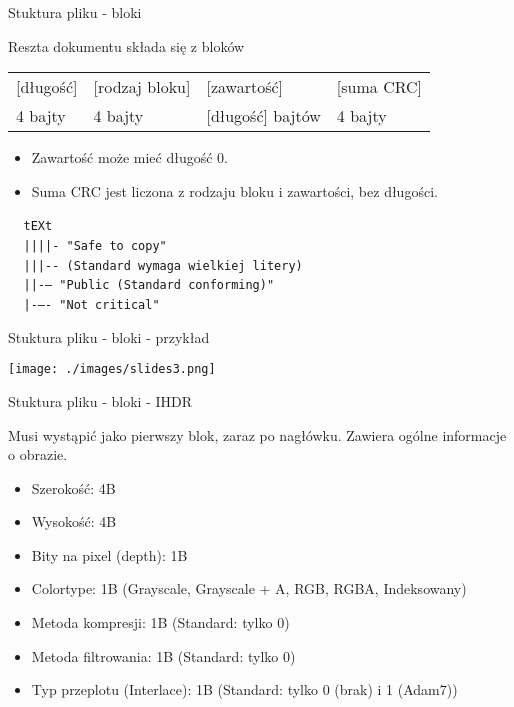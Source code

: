 \documentclass[presentation]{beamer}
\begin{document}
\begin{frame}[fragile,label={sec:orgf390abe}]{Stuktura pliku - bloki}
 \begin{block}{Reszta dokumentu składa się z bloków}
\begin{center}
\begin{tabular}{llll}
[długość] & [rodzaj bloku] & [zawartość] & [suma CRC]\\
4 bajty & 4 bajty & [długość] bajtów & 4 bajty\\
\end{tabular}
\end{center}

\begin{itemize}
\item Zawartość może mieć długość 0.
\item Suma CRC jest liczona z rodzaju bloku i zawartości, bez długości.
\end{itemize}

\(\>\) \(\>\)  \texttt{tEXt} \\
\(\>\) \(\>\)  \texttt{||||- "Safe to copy"} \\
\(\>\) \(\>\)  \texttt{|||-{}- (Standard wymaga wielkiej litery)} \\
\(\>\) \(\>\)  \texttt{||-{}-- "Public (Standard conforming)"} \\
\(\>\) \(\>\)  \texttt{|-{}--{}- "Not critical"} \\
\end{block}
\end{frame}

\begin{frame}[label={sec:org6177721}]{Stuktura pliku - bloki - przykład}
\begin{center}
\texttt{[image: ./images/slides3.png]}
\end{center}
\end{frame}

\begin{frame}[label={sec:orgd5a9d80}]{Stuktura pliku - bloki - IHDR}
\begin{block}{Musi wystąpić jako pierwszy blok, zaraz po nagłówku. Zawiera ogólne informacje o obrazie.}
\begin{itemize}
\item Szerokość: 4B
\item Wysokość: 4B
\item Bity na pixel (depth): 1B
\item Colortype: 1B (Grayscale, Grayscale + A, RGB, RGBA, Indeksowany)
\item Metoda kompresji: 1B (Standard: tylko 0)
\item Metoda filtrowania: 1B (Standard: tylko 0)
\item Typ przeplotu (Interlace): 1B (Standard: tylko 0 (brak) i 1 (Adam7))
\end{itemize}
\end{block}
\end{frame}
\end{document}
